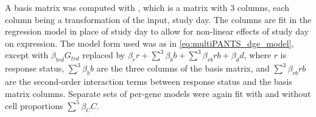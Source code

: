 A basis matrix \autocite{perperoglou2019ReviewSplineFunction} was computed with ,
which is a matrix with 3 columns, each column being a transformation of the input, study day.
The columns are fit in the regression model in place of study day to allow for non-linear effects of study day on expression.
The model form used was as in \cref{eq:multiPANTS_dge_model},
except with $\beta_{trd} G_{trd}$
replaced by $\beta_r r + \sum_{}^{3}{\beta_b b} + \sum_{}^{3}{\beta_{rb} rb} + \beta_d d$,
where $r$ is response status,
$\sum_{}^{3}{\beta_b b}$ are the three columns of the basis matrix,
and $\sum_{}^{3}{\beta_{rb} rb}$ are the second-order interaction terms between response status and the basis matrix columns.
Separate sets of per-gene models were again fit with and without cell proportions $\sum_{}^{5}{\beta_C C}$.

%

